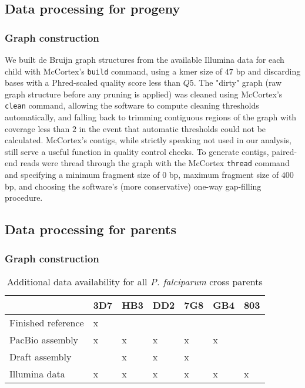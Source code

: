 \subsection{Data processing for progeny}

\subsubsection{Graph construction}

We built de Bruijn graph structures from the available Illumina data for each child with McCortex's \texttt{build} command, using a kmer size of $47$ bp and discarding bases with a Phred-scaled quality score\cite{Brockman:2008p231} less than $Q5$.  The "dirty" graph (raw graph structure before any pruning is applied) was cleaned using McCortex's \texttt{clean} command, allowing the software to compute cleaning thresholds automatically, and falling back to trimming contiguous regions of the graph with coverage less than $2$ in the event that automatic thresholds could not be calculated.  McCortex's contigs, while strictly speaking not used in our analysis, still serve a useful function in quality control checks.  To generate contigs, paired-end reads were thread through the graph with the McCortex \texttt{thread} command and specifying a minimum fragment size of $0$ bp, maximum fragment size of $400$ bp, and choosing the software's (more conservative) one-way gap-filling procedure.

\subsection{Data processing for parents}

\subsubsection{Graph construction}

\begin{table}[b]
\centering
\caption{Additional data availability for all \textit{P. falciparum} cross parents}
\label{tbl:reflist}
\begin{tabular}{@{}lllllll@{}}
\toprule
                   & 3D7 & HB3 & DD2 & 7G8 & GB4 & 803 \\ \midrule
Finished reference & x   &     &     &     &     &     \\
PacBio assembly    & x   & x   & x   & x   & x   &     \\
Draft assembly     &     & x   & x   & x   &     &     \\
Illumina data      & x   & x   & x   & x   & x   & x   \\ \bottomrule
\end{tabular}
\end{table}

